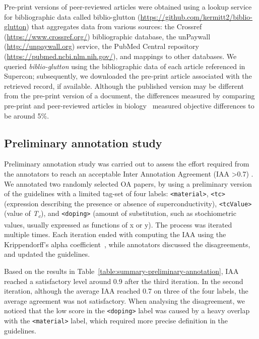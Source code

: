 \documentclass[]{interact}
\theoremstyle{plain}%
\theoremstyle{definition}
\theoremstyle{remark}
\begin{document}
Pre-print versions of peer-reviewed articles were obtained using a lookup service for bibliographic data called biblio-glutton (\url{https://github.com/kermitt2/biblio-glutton}) that aggregates data from various sources: the Crossref (\url{https://www.crossref.org/}) bibliographic database, the unPaywall (\url{http://unpaywall.org}) service, the PubMed Central repository (\url{https://pubmed.ncbi.nlm.nih.gov/}), and mappings to other databases. 
We queried \textit{biblio-glutton} using the bibliographic data of each article referenced in Supercon; subsequently, we downloaded the pre-print article associated with the retrieved record, if available. 
Although the published version may be different from the pre-print version of a document, the differences measured by comparing pre-print and peer-reviewed articles in biology~\cite{carneiro_comparing_2020} measured objective differences to be around 5\%.

\subsection{Preliminary annotation study}
\label{subsec:preliminary-annotation-study}
Preliminary annotation study was carried out to assess the effort required from the annotators to reach an acceptable Inter Annotation Agreement (IAA \textgreater 0.7) .
We annotated two randomly selected OA papers, by using a preliminary version of the guidelines with a limited tag-set of four labels: \texttt{<material>}, \texttt{<tc>} (expression describing the presence or absence of superconductivity), \texttt{<tcValue>} (value of \textit{T\textsubscript{c}}), and \texttt{<doping>} (amount of substitution, such as stochiometric values, usually expressed as functions of x or y).
The process was iterated multiple times.
Each iteration ended with computing the IAA using the Krippendorff's alpha coefficient~\cite{Krippendorff2004ReliabilityIC,Zapf2016MeasuringIR}, while annotators discussed the disagreements, and updated the guidelines.

Based on the results in Table~\ref{table:summary-preliminary-annotation}, IAA reached a satisfactory level around 0.9 after the third iteration. 
In the second iteration, although the average IAA reached 0.7 on three of the four labels, the average agreement was not satisfactory. 
When analysing the disagreement, we noticed that the low score in the \texttt{<doping>} label was caused by a heavy overlap with the \texttt{<material>} label, which required more precise definition in the guidelines. 
\end{document}
